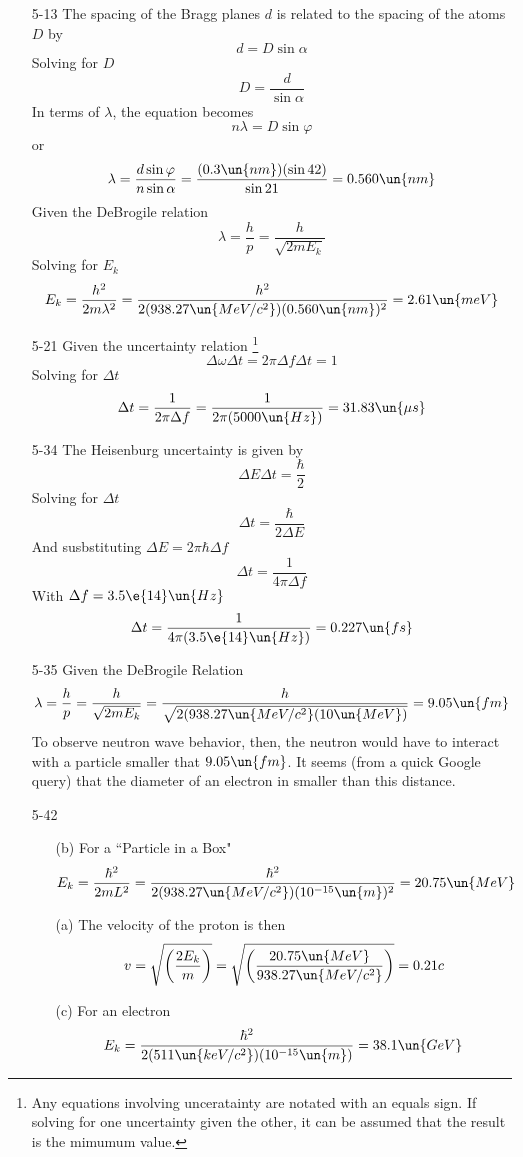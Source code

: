 \documentclass[]{2620hw}
\begin{document}
\maketitle
\begin{enumerate}

\item [5-13]
	The spacing of the Bragg planes $d$ is related to the spacing of the atoms $D$ by
	\[
		d = D \sin{\alpha}
	\]
	Solving for $D$
	\[
		D = \frac{d}{\sin{\alpha}}
	\]
	In terms of $\lambda$, the equation becomes
	\[
		n\lambda = D \sin{\varphi}
	\] 
	or
	\[
		 \lambda = \frac{d\sin{\varphi}}{n \sin{\alpha}} =   \frac{(0.3\un{nm}) (\sin{42})}{\sin{21}} = 0.560 \un{nm}
	\]
	Given the DeBrogile relation 
	\[
		\lambda = \frac{h}{p} =  \frac{h}{\sqrt{ 2mE_k }}
	\]
	Solving for $E_k$
	\[
		E_k = \frac{h^2}{2m\lambda^2} = \frac{h^2}{2(938.27 \un{MeV/c^2})(0.560\un{nm})^2} = 2.61 \un{meV}	
	\]

\item [5-21]
	Given the uncertainty relation \footnote{Any equations involving unceratainty are notated with an equals sign. If solving for one uncertainty given the other, it can be assumed that the result is the mimumum value.} 
	\[
		\Delta \omega \Delta t = 2\pi \Delta f \Delta t = 1
	\]
	Solving for $\Delta t$
	\[
		\Delta t = \frac{1}{2\pi \Delta f} = \frac{1}{2\pi (5000 \un{Hz})} = 31.83 \un{\mu s}
	\]

\item [5-34]
	The Heisenburg uncertainty is given by 
	\[
		\Delta E \Delta t = \frac{\hbar}{2}
	\]
	Solving for $\Delta t$
	\[
		\Delta t = \frac{\hbar}{2 \Delta E}
	\]
	And susbstituting $\Delta E = 2\pi\hbar \Delta f$
	\[
		\Delta t = \frac{1}{4\pi \Delta f}
	\]
	With $\Delta f = 3.5 \e{14}\un{Hz}$
	\[
			\Delta t = \frac{1}{4\pi ( 3.5 \e{14}\un{Hz})} = 0.227 \un{fs}
	\]

\item [5-35]
	Given the DeBrogile Relation
	\[
		\lambda = \frac{h}{p} = \frac{h}{\sqrt {2mE_k}} = \frac{h}{\sqrt{2(938.27\un{MeV/c^2}(10\un{MeV})}} = 9.05 \un{fm}
	\]
	To observe neutron wave behavior, then, the neutron would have to interact with a particle smaller that $9.05 \un{fm}$. It seems (from a quick Google query) that the diameter of an electron in smaller than this distance. 

\item [5-42]
\begin{enumerate}
	\item [(b)] For a ``Particle in a Box"
	\[
		E_k = \frac{\hbar^2}{2mL^2} = \frac{\hbar^2}{2(938.27 \un{MeV/c^2})(10^{-15}\un{m})^2} = 20.75 \un{MeV}
	\]
	\item [(a)]
	The velocity of the proton is then
	\[
		v = \sqrt{ \left(\frac{2E_k}{m}\right) } = \sqrt{ \left(\frac{20.75 \un{MeV}}{938.27 \un{MeV/c^2}}\right)} = 0.21{c}
	\]
	\item [(c)] For an electron
	\[
		E_k = \frac{\hbar^2}{2(511\un{keV/c^2})(10^{-15}\un{m})} = 38.1 \un{GeV}
	\]
\end{enumerate}


\end{enumerate}
\end{document}
